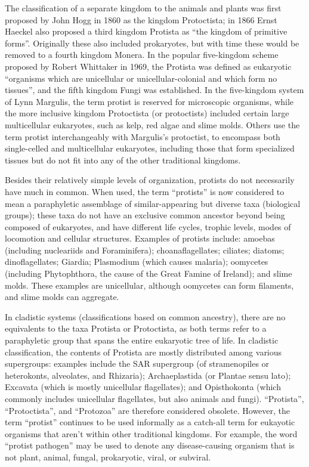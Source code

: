 The classification of a separate kingdom to the animals and plants was first proposed by John Hogg in 1860 as the kingdom Protoctista; in 1866 Ernst Haeckel also proposed a third kingdom Protista as ``the kingdom of primitive forms''. Originally these also included prokaryotes, but with time these would be removed to a fourth kingdom Monera. In the popular five-kingdom scheme proposed by Robert Whittaker in 1969, the Protista was defined as eukaryotic ``organisms which are unicellular or unicellular-colonial and which form no tissues'', and the fifth kingdom Fungi was established. In the five-kingdom system of Lynn Margulis, the term protist is reserved for microscopic organisms, while the more inclusive kingdom Protoctista (or protoctists) included certain large multicellular eukaryotes, such as kelp, red algae and slime molds. Others use the term protist interchangeably with Margulis's protoctist, to encompass both single-celled and multicellular eukaryotes, including those that form specialized tissues but do not fit into any of the other traditional kingdoms.

Besides their relatively simple levels of organization, protists do not necessarily have much in common. When used, the term ``protists'' is now considered to mean a paraphyletic assemblage of similar-appearing but diverse taxa (biological groups); these taxa do not have an exclusive common ancestor beyond being composed of eukaryotes, and have different life cycles, trophic levels, modes of locomotion and cellular structures. Examples of protists include: amoebas (including nucleariids and Foraminifera); choanaflagellates; ciliates; diatoms; dinoflagellates; Giardia; Plasmodium (which causes malaria); oomycetes (including Phytophthora, the cause of the Great Famine of Ireland); and slime molds. These examples are unicellular, although oomycetes can form filaments, and slime molds can aggregate.

In cladistic systems (classifications based on common ancestry), there are no equivalents to the taxa Protista or Protoctista, as both terms refer to a paraphyletic group that spans the entire eukaryotic tree of life. In cladistic classification, the contents of Protista are mostly distributed among various supergroups: examples include the SAR supergroup (of stramenopiles or heterokonts, alveolates, and Rhizaria); Archaeplastida (or Plantae sensu lato); Excavata (which is mostly unicellular flagellates); and Opisthokonta (which commonly includes unicellular flagellates, but also animals and fungi). ``Protista'', ``Protoctista'', and ``Protozoa'' are therefore considered obsolete. However, the term ``protist'' continues to be used informally as a catch-all term for eukayotic organisms that aren't within other traditional kingdoms. For example, the word ``protist pathogen'' may be used to denote any disease-causing organism that is not plant, animal, fungal, prokaryotic, viral, or subviral.

